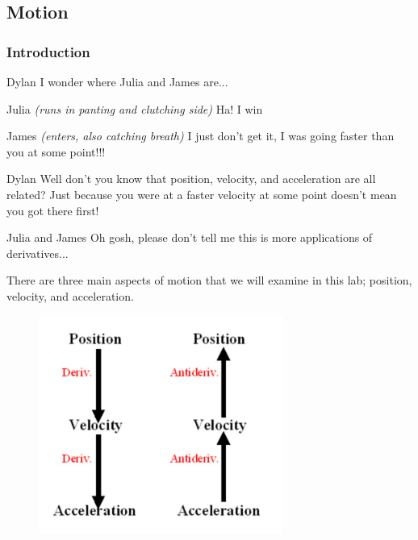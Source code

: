 \documentclass{ximera}
\begin{document}
\subsection{Motion}
\subsubsection{Introduction}
\begin{dialogue}
\item[Dylan] I wonder where Julia and James are...
\item[Julia] \textit{(runs in panting and clutching side)} Ha! I win
\item[James] \textit{(enters, also catching breath)} I just don't get it, I was going faster than you at some point!!!
\item[Dylan] Well don't you know that position, velocity, and acceleration are all related? Just because you were at a faster velocity at some point doesn't mean you got there first!
\item[Julia and James] Oh gosh, please don't tell me this is more applications of derivatives...
\end{dialogue}
There are three main aspects of motion that we will examine in this lab; position, velocity, and acceleration.

\begin{figure}
	\centering
    \includegraphics[width=80mm]{motion.jpg}
\end{figure}
\end{document}
